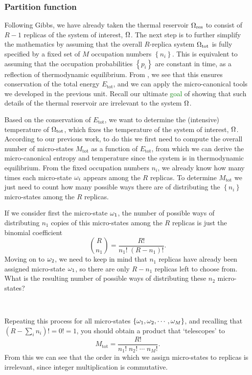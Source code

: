 \subsubsection{\label{sec:canon_part}Partition function}
Following Gibbs, we have already taken the thermal reservoir $\Omega_{\text{res}}$ to consist of $R - 1$ replicas of the system of interest, $\Omega$.
The next step is to further simplify the mathematics by assuming that the overall $R$-replica system $\Omega_{\text{tot}}$ is fully specified by a fixed set of $M$ occupation numbers $\left\{n_i\right\}$.
This is equivalent to assuming that the occupation probabilities $\left\{p_i\right\}$ are constant in time, as a reflection of thermodynamic equilibrium.
From , we see that this ensures conservation of the total energy $E_{\text{tot}}$, and we can apply the micro-canonical tools we developed in the previous unit.
Recall our ultimate \textcolor{green}{goal} of showing that such details of the thermal reservoir are irrelevant to the system $\Omega$.

Based on the conservation of $E_{\text{tot}}$, we want to determine the (intensive) temperature of $\Omega_{\text{tot}}$, which fixes the temperature of the system of interest, $\Omega$.
According to our previous work, to do this we first need to compute the overall number of micro-states $M_{\text{tot}}$ as a function of $E_{\text{tot}}$, from which we can derive the micro-canonical entropy and temperature since the system is in thermodynamic equilibrium.
From the fixed occupation numbers $n_i$, we already know how many times each micro-state $\omega_i$ appears among the $R$ replicas.
To determine $M_{\text{tot}}$ we just need to count how many possible ways there are of distributing the $\left\{n_i\right\}$ micro-states among the $R$ replicas.

If we consider first the micro-state $\omega_1$, the number of possible ways of distributing $n_1$ copies of this micro-states among the $R$ replicas is just the binomial coefficient
\begin{equation*}
  \binom{R}{n_1} = \frac{R!}{n_1! \; (R - n_1)!}.
\end{equation*}
Moving on to $\omega_2$, we need to keep in mind that $n_1$ replicas have already been assigned micro-state $\omega_1$, so there are only $R - n_1$ replicas left to choose from.
What is the resulting number of possible ways of distributing these $n_2$ micro-states?
\begin{mdframed}
  \ \\[50 pt]
\end{mdframed}
Repeating this process for all micro-states $\left\{\omega_1, \omega_2, \cdots, \omega_M\right\}$, and recalling that $\left(R - \sum_i n_i \right)! = 0! = 1$, you should obtain a product that `telescopes' to
\begin{equation}
  \label{eq:telescoped}
  M_{\text{tot}} = \frac{R!}{n_1! \; n_2! \; \cdots \; n_M!}.
\end{equation}
From this we can see that the order in which we assign micro-states to replicas is irrelevant, since integer multiplication is commutative.

